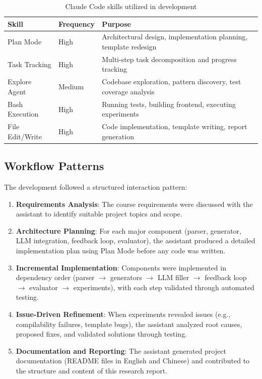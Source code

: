 \documentclass[11pt,a4paper]{article}
\begin{document}
{{\begin{table}[H]
\centering
\caption{Claude Code skills utilized in development}
\label{tab:skills}
\begin{tabular}{llp{6cm}}
\toprule
\textbf{Skill} & \textbf{Frequency} & \textbf{Purpose} \\
\midrule
Plan Mode & High & Architectural design, implementation planning, template redesign \\
Task Tracking & High & Multi-step task decomposition and progress tracking \\
Explore Agent & Medium & Codebase exploration, pattern discovery, test coverage analysis \\
Bash Execution & High & Running tests, building frontend, executing experiments \\
File Edit/Write & High & Code implementation, template writing, report generation \\
\bottomrule
\end{tabular}
\end{table}

\subsection{Workflow Patterns}

The development followed a structured interaction pattern:

\begin{enumerate}[leftmargin=*]
    \item \textbf{Requirements Analysis}: The course requirements were discussed with the assistant to identify suitable project topics and scope.
    \item \textbf{Architecture Planning}: For each major component (parser, generator, LLM integration, feedback loop, evaluator), the assistant produced a detailed implementation plan using Plan Mode before any code was written.
    \item \textbf{Incremental Implementation}: Components were implemented in dependency order (parser $\rightarrow$ generators $\rightarrow$ LLM filler $\rightarrow$ feedback loop $\rightarrow$ evaluator $\rightarrow$ experiments), with each step validated through automated testing.
    \item \textbf{Issue-Driven Refinement}: When experiments revealed issues (e.g., compilability failures, template bugs), the assistant analyzed root causes, proposed fixes, and validated solutions through testing.
    \item \textbf{Documentation and Reporting}: The assistant generated project documentation (README files in English and Chinese) and contributed to the structure and content of this research report.
\end{enumerate}

}}
\end{document}
